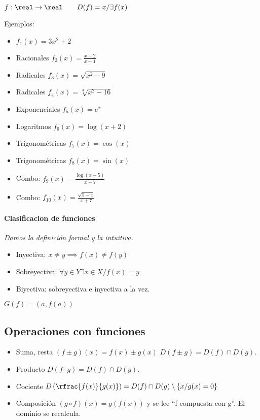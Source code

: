 $f:\real\to\real\quad\quad D(f) = {x / \exists f(x)}$

Ejemplos:
\begin{itemize}
	\item $f_1(x) = 3x^2+2$
	\item Racionales $f_2(x) = \frac{x+2}{x-1}$
	\item Radicales $f_3(x) = \sqrt{x^2-9}$
	\item Radicales $f_4(x) = \sqrt[3]{x^2-16}$
	\item Exponenciales $f_5(x) = e^x$
	\item Logaritmos $f_6(x) = \log(x+2)$
	\item Trigonométricas $f_7(x) = \cos(x)$
	\item Trigonométricas $f_8(x) = \sin(x)$
	\item Combo: $f_9(x) = \frac{\log(x-5)}{x+7}$
	\item Combo: $f_{10}(x) = \frac{\sqrt{5-x}}{x+7}$
\end{itemize}


\paragraph{Clasificacion de funciones} \textit{Damos la definición formal y la intuitiva.}

\begin{itemize}
	\item Inyectiva: $x\neq y \implies f(x) \neq f(y)  $
	\item Sobreyectiva: $\forall y\in Y \exists x\in X / f(x) = y$
	\item Biyectiva: sobreyectiva e inyectiva a la vez.
\end{itemize}

 $G(f) = {\left(a,f(a)\right)}$

\subsection{Operaciones con funciones}
\begin{itemize}
	\item Suma, resta $(f\pm g)(x) = f(x) \pm g(x)$
	\subitem $D(f\pm g) = D(f)\cap D(g)$.
	\item Producto
	\subitem $D(f·g) = D(f)\cap D(g)$.
	\item Cociente 
	\subitem $D\left(\rfrac{f(x)}{g(x)}\right) = D(f)\cap D(g) \setminus \{x/g(x) = 0\}$
	\item Composición $(g\circ f)(x) = g\left(f(x)\right)$ y se lee ``f compuesta con g''.
	\subitem El dominio se recalcula.
\end{itemize}

